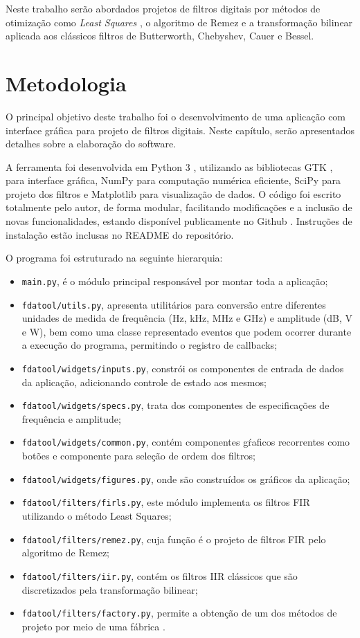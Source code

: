 \documentclass[12pt,a4paper]{report}
\begin{document}
  Neste trabalho serão abordados projetos de filtros digitais por métodos de otimização como
  \textit{Least Squares} \cite{selesnick}, o algoritmo de Remez \cite{mcclellan_parks} e a transformação bilinear
  \cite{diniz} aplicada aos clássicos filtros de Butterworth, Chebyshev, Cauer e Bessel.
\chapter{Metodologia}
  O principal objetivo deste trabalho foi o desenvolvimento de uma aplicação com interface gráfica para projeto
  de filtros digitais. Neste capítulo, serão apresentados detalhes sobre a elaboração do software.

  A ferramenta foi desenvolvida em Python 3 \cite{python}, utilizando as bibliotecas GTK \cite{gtk, pygtk}, para
  interface gráfica, NumPy \cite{numpy} para computação numérica eficiente, SciPy \cite{scipy} para projeto dos
  filtros e Matplotlib \cite{matplotlib} para visualização de dados.
  O código foi escrito totalmente pelo autor, de forma modular, facilitando modificações e a inclusão de novas
  funcionalidades, estando disponível publicamente no Github \cite{source_code}. Instruções de instalação estão
  inclusas no README do repositório.

  O programa foi estruturado na seguinte hierarquia:
  \begin{itemize}
    \item \texttt{main.py}, é o módulo principal responsável por montar toda a aplicação;
    \item \texttt{fdatool/utils.py}, apresenta utilitários para conversão entre diferentes unidades de medida de
      frequência (Hz, kHz, MHz e GHz) e amplitude (dB, V e W), bem como uma classe representado eventos que podem
      ocorrer durante a execução do programa, permitindo o registro de callbacks;
    \item \texttt{fdatool/widgets/inputs.py}, constrói os componentes de entrada de dados da aplicação,
      adicionando controle de estado aos mesmos;
    \item \texttt{fdatool/widgets/specs.py}, trata dos componentes de especificações de frequência e amplitude;
    \item \texttt{fdatool/widgets/common.py}, contém componentes gŕaficos recorrentes como botões e componente
      para seleção de ordem dos filtros;
    \item \texttt{fdatool/widgets/figures.py}, onde são construídos os gráficos da aplicação;
    \item \texttt{fdatool/filters/firls.py}, este módulo implementa os filtros FIR utilizando o método Least
      Squares;
    \item \texttt{fdatool/filters/remez.py}, cuja função é o projeto de filtros FIR pelo algoritmo de Remez;
    \item \texttt{fdatool/filters/iir.py}, contém os filtros IIR clássicos que são discretizados pela
      transformação bilinear;
    \item \texttt{fdatool/filters/factory.py}, permite a obtenção de um dos métodos de projeto por meio de uma
      fábrica \cite{gang_of_four}.
  \end{itemize}
\end{document}
